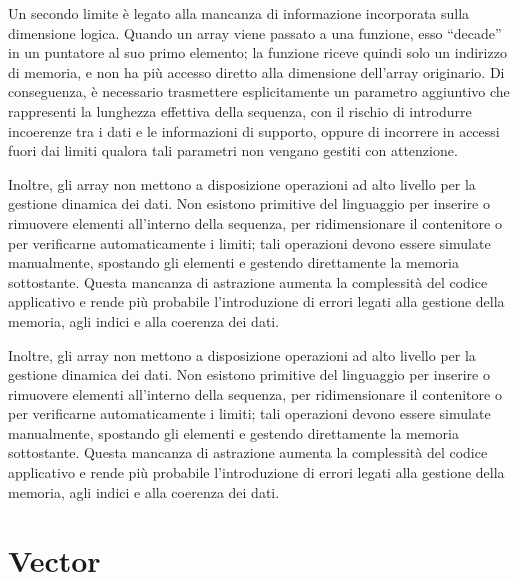 Un secondo limite è legato alla mancanza di informazione incorporata sulla dimensione logica. Quando un array viene passato a una funzione, esso “decade” in un puntatore al suo primo elemento; la funzione riceve quindi solo un indirizzo di memoria, e non ha più accesso diretto alla dimensione dell’array originario. Di conseguenza, è necessario trasmettere esplicitamente un parametro aggiuntivo che rappresenti la lunghezza effettiva della sequenza, con il rischio di introdurre incoerenze tra i dati e le informazioni di supporto, oppure di incorrere in accessi fuori dai limiti qualora tali parametri non vengano gestiti con attenzione.


Inoltre, gli array non mettono a disposizione operazioni ad alto livello per la gestione dinamica dei dati. Non esistono primitive del linguaggio per inserire o rimuovere elementi all'interno della sequenza, per ridimensionare il contenitore o per verificarne automaticamente i limiti; tali operazioni devono essere simulate manualmente, spostando gli elementi e gestendo direttamente la memoria sottostante. Questa mancanza di astrazione aumenta la complessità del codice applicativo e rende più probabile l'introduzione di errori legati alla gestione della memoria, agli indici e alla coerenza dei dati.







Inoltre, gli array non mettono a disposizione operazioni ad alto livello per la gestione dinamica dei dati. Non esistono primitive del linguaggio per inserire o rimuovere elementi all’interno della sequenza, per ridimensionare il contenitore o per verificarne automaticamente i limiti; tali operazioni devono essere simulate manualmente, spostando gli elementi e gestendo direttamente la memoria sottostante. Questa mancanza di astrazione aumenta la complessità del codice applicativo e rende più probabile l’introduzione di errori legati alla gestione della memoria, agli indici e alla coerenza dei dati.



















\section{Vector}
